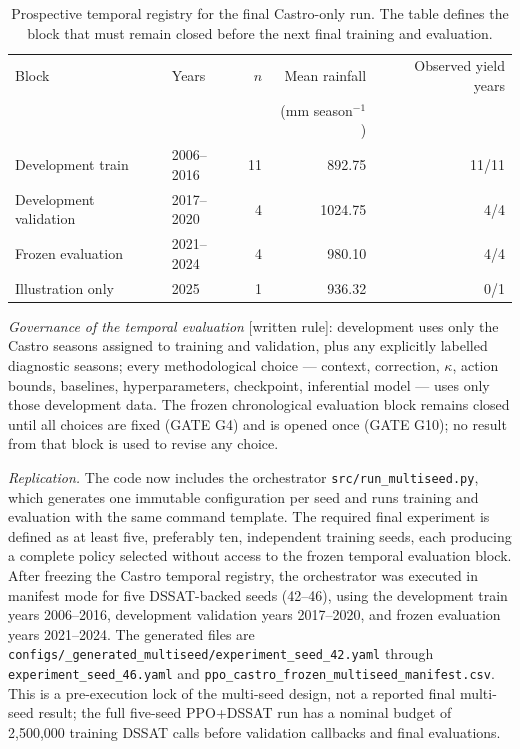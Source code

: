 \documentclass[times,final,authoryear]{elsarticle}
\begin{document}
\begin{table}[!h]
\centering
\scriptsize
\caption{Prospective temporal registry for the final Castro-only run. The table defines the block that must remain closed before the next final training and evaluation.}
\label{tab_temporal_registry_castro}
\begin{tabular}{llrrr}
\hline
Block & Years & $n$ & Mean rainfall & Observed yield years \\
      &       &     & (mm season$^{-1}$) & \\
\hline
Development train & 2006--2016 & 11 & 892.75 & 11/11 \\
Development validation & 2017--2020 & 4 & 1024.75 & 4/4 \\
Frozen evaluation & 2021--2024 & 4 & 980.10 & 4/4 \\
Illustration only & 2025 & 1 & 936.32 & 0/1 \\
\hline
\end{tabular}
\end{table}

\emph{Governance of the temporal evaluation} [written rule]: development uses only the Castro seasons assigned to training and validation, plus any explicitly labelled diagnostic seasons; every methodological choice --- context, correction, $\kappa$, action bounds, baselines, hyperparameters, checkpoint, inferential model --- uses only those development data. The frozen chronological evaluation block remains closed until all choices are fixed (GATE G4) and is opened once (GATE G10); no result from that block is used to revise any choice.

\emph{Replication.} The code now includes the orchestrator \texttt{src/run\_multiseed.py}, which generates one immutable configuration per seed and runs training and evaluation with the same command template. The required final experiment is defined as at least five, preferably ten, independent training seeds, each producing a complete policy selected without access to the frozen temporal evaluation block. After freezing the Castro temporal registry, the orchestrator was executed in manifest mode for five DSSAT-backed seeds (42--46), using the development train years 2006--2016, development validation years 2017--2020, and frozen evaluation years 2021--2024. The generated files are \texttt{configs/\_generated\_multiseed/experiment\_seed\_42.yaml} through \texttt{experiment\_seed\_46.yaml} and \texttt{ppo\_castro\_frozen\_multiseed\_manifest.csv}. This is a pre-execution lock of the multi-seed design, not a reported final multi-seed result; the full five-seed PPO+DSSAT run has a nominal budget of 2,500,000 training DSSAT calls before validation callbacks and final evaluations.
\end{document}
